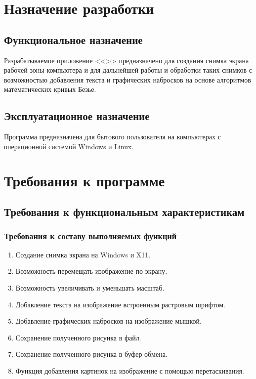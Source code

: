 \documentclass[a4paper,12pt,reqno]{article}
\begin{document}
  \newpage
  \section{Назначение разработки}
  \subsection{Функциональное назначение}
  Разрабатываемое приложение <<\CRTname>> предназначено для создания снимка экрана рабочей зоны компьютера и для дальнейшей работы и обработки таких снимков с возможностью добавления текста и графических набросков на основе алгоритмов математических кривых Безье.

  \subsection{Эксплуатационное назначение}
  Программа предназначена для бытового пользователя на компьютерах с операционной системой Windows и Linux.

  \newpage
  \section{Требования к программе}
  \subsection{Требования к функциональным характеристикам}
  \subsubsection{Требования к составу выполняемых функций}
  \label{sec:funcs}
  \begin{enumerate}
    \item Создание снимка экрана на Windows и X11.
    \item Возможность перемещать изображение по экрану.
    \item Возможность увеличивать и уменьшать масштаб.
    \item Добавление текста на изображение встроенным растровым шрифтом.
    \item Добавление графических набросков на изображение мышкой.
    \item Сохранение полученного рисунка в файл.
    \item Сохранение полученного рисунка в буфер обмена.
    \item Функция добавления картинок на изображение с помощью перетаскивания.
  \end{enumerate}
\end{document}

